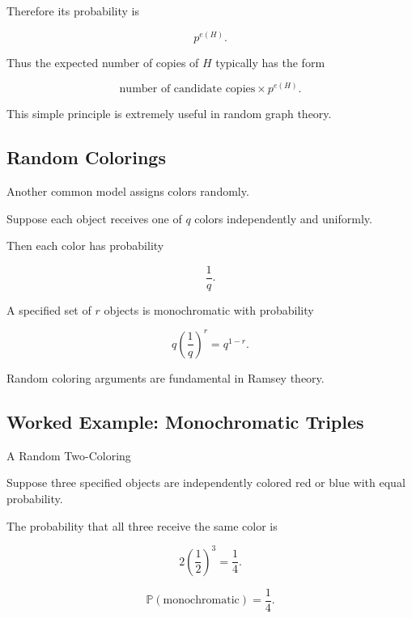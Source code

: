 Therefore its probability is

\[
p^{e(H)}.
\]

Thus the expected number of copies of \(H\) typically has the form

\[
\boxed{
\text{number of candidate copies}
\times
p^{e(H)}.
}
\]

This simple principle is extremely useful in random graph theory.

\subsection{Random Colorings}
\label{subsec:random-colorings}

Another common model assigns colors randomly.

Suppose each object receives one of \(q\) colors independently and
uniformly.

Then each color has probability

\[
\frac1q.
\]

A specified set of \(r\) objects is monochromatic with probability

\[
\boxed{
q\left(\frac1q\right)^r
=
q^{1-r}.
}
\]

Random coloring arguments are fundamental in Ramsey theory.

\subsection{Worked Example: Monochromatic Triples}
\label{subsec:worked-random-coloring}

\begin{workedexamplebox}{A Random Two-Coloring}

Suppose three specified objects are independently colored red or blue
with equal probability.

The probability that all three receive the same color is

\[
2\left(\frac12\right)^3
=
\frac14.
\]

\begin{answerbox}
\[
\boxed{
\mathbb{P}(\text{monochromatic})=\frac14.
}
\]
\end{answerbox}

\end{workedexamplebox}

